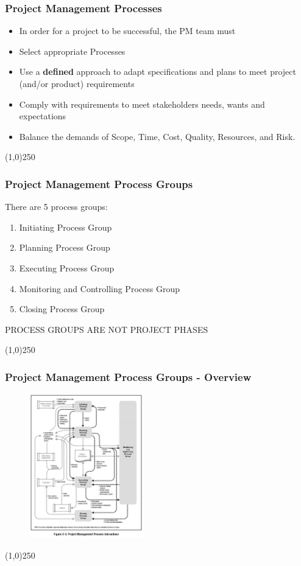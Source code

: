 \begin{frame}
\frametitle{Project Management Processes}
\begin{itemize}
	\item In order for a project to be successful, the PM team must\\
	\item Select appropriate Processes
	\item Use a \textbf{defined} approach to adapt specifications and plans to meet project (and/or product) requirements
	\item Comply with requirements to meet stakeholders needs, wants and expectations
	\item Balance the demands of Scope, Time, Cost, Quality, Resources, and Risk.
\end{itemize}
\end{frame}
\begin{center}\line(1,0){250}\end{center}



\begin{frame}
\frametitle{Project Management Process Groups}
There are 5 process groups:
\begin{enumerate}
	\item Initiating Process Group
	\item Planning Process Group
	\item Executing Process Group
	\item Monitoring and Controlling Process Group
	\item Closing Process Group
\end{enumerate}
PROCESS GROUPS ARE NOT PROJECT PHASES\\
\end{frame}
\begin{center}\line(1,0){250}\end{center}



\begin{frame}
\frametitle{Project Management Process Groups - Overview}
 \begin{figure}
 	\centering
 		\includegraphics[width = 5cm]{images/Fig3-3.jpg}
 	\label{fig:3-3}
 \end{figure}
\end{frame}
\begin{center}\line(1,0){250}\end{center}



